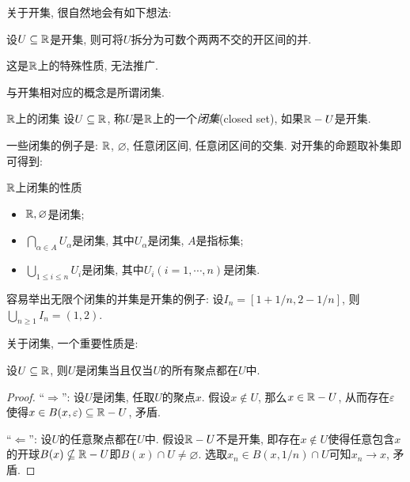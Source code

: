 关于开集, 很自然地会有如下想法: 

\begin{proposition}{}
	设$U \subseteq \mathbb{R}$是开集, 则可将$U$拆分为可数个两两不交的开区间的并. 
\end{proposition}
\begin{remark}
	这是$\mathbb{R}$上的特殊性质, 无法推广. 
\end{remark}

与开集相对应的概念是所谓闭集. 

\begin{definition}{$\mathbb{R}$上的闭集}
	设$U \subseteq \mathbb{R}$, 称$U$是$\mathbb{R}$上的一个\textit{闭集}(closed set), 如果$\mathbb{R} - U$是开集. 
\end{definition}

一些闭集的例子是: $\mathbb{R}$, $\varnothing$, 任意闭区间, 任意闭区间的交集. 对开集的命题取补集即可得到: 

\begin{proposition}{$\mathbb{R}$上闭集的性质}
	\vspace{-2em}
	\begin{itemize}
		\item $\mathbb{R},\varnothing$是闭集; 
		\item $\bigcap_{\alpha \in A} U_{\alpha}$是闭集, 其中$U_{\alpha}$是闭集, $A$是指标集; 
		\item $\bigcup_{1 \leq i \leq n} U_i$是闭集, 其中$U_i(i=1,\cdots ,n)$是闭集. 
	\end{itemize}
\end{proposition}
\begin{remark}
	容易举出无限个闭集的并集是开集的例子: 设$I_n = [1+1/n,2-1/n]$, 则$\bigcup_{n\geq 1} I_n = (1,2)$. 
\end{remark}

关于闭集, 一个重要性质是: 

\begin{proposition}{}
	设$U \subseteq \mathbb{R}$, 则$U$是闭集当且仅当$U$的所有聚点都在$U$中. 
\end{proposition}
\begin{proof}
	“$\Rightarrow$”: 设$U$是闭集, 任取$U$的聚点$x$. 假设$x \notin U$, 那么$x \in \mathbb{R} - U$, 从而存在$\varepsilon$使得$x \in B(x,\varepsilon) \subseteq \mathbb{R} - U$, 矛盾. 
	
	“$\Leftarrow$”: 设$U$的任意聚点都在$U$中. 假设$\mathbb{R} - U$不是开集, 即存在$x \notin U$使得任意包含$x$的开球$B(x) \nsubseteq \mathbb{R} - U$即$B(x) \cap U \neq \varnothing$. 选取$x_n \in B(x,1/n) \cap U$可知$x_n \to x$, 矛盾. 
\end{proof}



